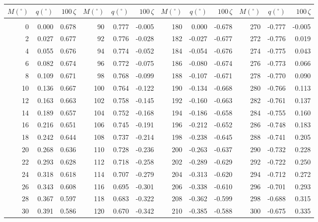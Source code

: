 \newpage
\begin{table}\centering
\small{ \begin{tabular}{rrr|rrr|rrr|rrr}
$M(^\circ)$ & $q(^\circ)$  & $100\,\zeta$ & $M(^\circ)$ & $q(^\circ)$  & $100\,\zeta$ & $M(^\circ)$ & $q(^\circ)$  & $100\,\zeta$& $M(^\circ)$ & $q(^\circ)$  & $100\,\zeta$\\\hline
&&&&&&&&&&&\\[-1.75ex]
   0 &   0.000 &  0.678 &  90 &   0.777 & -0.005 & 180 &   0.000 & -0.678 & 270 &  -0.777 & -0.005\\
  2 &   0.027 &  0.677 &  92 &   0.776 & -0.028 & 182 &  -0.027 & -0.677 & 272 &  -0.776 &  0.019\\
  4 &   0.055 &  0.676 &  94 &   0.774 & -0.052 & 184 &  -0.054 & -0.676 & 274 &  -0.775 &  0.043\\
  6 &   0.082 &  0.674 &  96 &   0.772 & -0.075 & 186 &  -0.080 & -0.674 & 276 &  -0.773 &  0.066\\
  8 &   0.109 &  0.671 &  98 &   0.768 & -0.099 & 188 &  -0.107 & -0.671 & 278 &  -0.770 &  0.090\\
 10 &   0.136 &  0.667 & 100 &   0.764 & -0.122 & 190 &  -0.134 & -0.668 & 280 &  -0.766 &  0.113\\
 12 &   0.163 &  0.663 & 102 &   0.758 & -0.145 & 192 &  -0.160 & -0.663 & 282 &  -0.761 &  0.137\\
 14 &   0.189 &  0.657 & 104 &   0.752 & -0.168 & 194 &  -0.186 & -0.658 & 284 &  -0.755 &  0.160\\
 16 &   0.216 &  0.651 & 106 &   0.745 & -0.191 & 196 &  -0.212 & -0.652 & 286 &  -0.748 &  0.183\\
 18 &   0.242 &  0.644 & 108 &   0.737 & -0.214 & 198 &  -0.238 & -0.645 & 288 &  -0.741 &  0.205\\
 20 &   0.268 &  0.636 & 110 &   0.728 & -0.236 & 200 &  -0.263 & -0.637 & 290 &  -0.732 &  0.228\\
 22 &   0.293 &  0.628 & 112 &   0.718 & -0.258 & 202 &  -0.289 & -0.629 & 292 &  -0.722 &  0.250\\
 24 &   0.318 &  0.618 & 114 &   0.707 & -0.279 & 204 &  -0.313 & -0.620 & 294 &  -0.712 &  0.272\\
 26 &   0.343 &  0.608 & 116 &   0.695 & -0.301 & 206 &  -0.338 & -0.610 & 296 &  -0.701 &  0.293\\
 28 &   0.367 &  0.597 & 118 &   0.683 & -0.322 & 208 &  -0.362 & -0.599 & 298 &  -0.688 &  0.315\\
 30 &   0.391 &  0.586 & 120 &   0.670 & -0.342 & 210 &  -0.385 & -0.588 & 300 &  -0.675 &  0.335\\

\end{tabular}}
\end{table}
